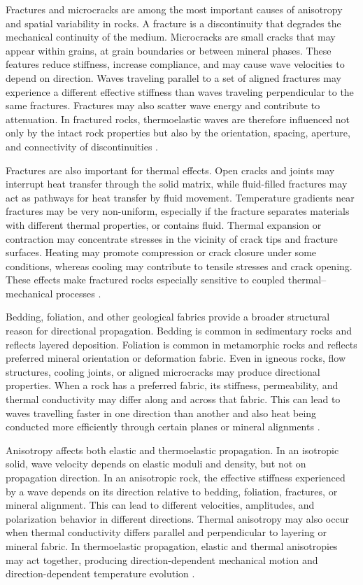 Fractures and microcracks are among the most important causes of anisotropy and spatial variability in rocks. A fracture is a discontinuity that degrades the mechanical continuity of the medium. Microcracks are small cracks that may appear within grains, at grain boundaries or between mineral phases. These features reduce stiffness, increase compliance, and may cause wave velocities to depend on direction. Waves traveling parallel to a set of aligned fractures may experience a different effective stiffness than waves traveling perpendicular to the same fractures. Fractures may also scatter wave energy and contribute to attenuation. In fractured rocks, thermoelastic waves are therefore influenced not only by the intact rock properties but also by the orientation, spacing, aperture, and connectivity of discontinuities \cite{jaeger2007,schultz2019,crampin1981}.

Fractures are also important for thermal effects. Open cracks and joints may interrupt heat transfer through the solid matrix, while fluid-filled fractures may act as pathways for heat transfer by fluid movement. Temperature gradients near fractures may be very non-uniform, especially if the fracture separates materials with different thermal properties, or contains fluid. Thermal expansion or contraction may concentrate stresses in the vicinity of crack tips and fracture surfaces. Heating may promote compression or crack closure under some conditions, whereas cooling may contribute to tensile stresses and crack opening. These effects make fractured rocks especially sensitive to coupled thermal--mechanical processes \cite{jaeger2007,robertson1988,schultz2019}.

Bedding, foliation, and other geological fabrics provide a broader structural reason for directional propagation. Bedding is common in sedimentary rocks and reflects layered deposition. Foliation is common in metamorphic rocks and reflects preferred mineral orientation or deformation fabric. Even in igneous rocks, flow structures, cooling joints, or aligned microcracks may produce directional properties. When a rock has a preferred fabric, its stiffness, permeability, and thermal conductivity may differ along and across that fabric. This can lead to waves travelling faster in one direction than another and also heat being conducted more efficiently through certain planes or mineral alignments \cite{crampin1981,thomsen1986,mavko2009}.

Anisotropy affects both elastic and thermoelastic propagation. In an isotropic solid, wave velocity depends on elastic moduli and density, but not on propagation direction. In an anisotropic rock, the effective stiffness experienced by a wave depends on its direction relative to bedding, foliation, fractures, or mineral alignment. This can lead to different velocities, amplitudes, and polarization behavior in different directions. Thermal anisotropy may also occur when thermal conductivity differs parallel and perpendicular to layering or mineral fabric. In thermoelastic propagation, elastic and thermal anisotropies may act together, producing direction-dependent mechanical motion and direction-dependent temperature evolution \cite{crampin1981,thomsen1986,robertson1988}.

